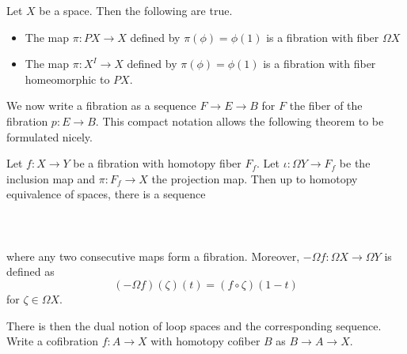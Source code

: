 \documentclass[a4paper]{article}
\begin{document}
\begin{thm}{}{} Let $X$ be a space. Then the following are true. 
\begin{itemize}
\item The map $\pi:PX\to X$ defined by $\pi(\phi)=\phi(1)$ is a fibration with fiber $\Omega X$
\item The map $\pi:X^I\to X$ defined by $\pi(\phi)=\phi(1)$ is a fibration with fiber homeomorphic to $PX$. 
\end{itemize}
\end{thm}

We now write a fibration as a sequence $F\to E\to B$ for $F$ the fiber of the fibration $p:E\to B$. This compact notation allows the following theorem to be formulated nicely. 

\begin{thm}{}{} Let $f:X\to Y$ be a fibration with homotopy fiber $F_f$. Let $\iota:\Omega Y\to F_f$ be the inclusion map and $\pi:F_f\to X$ the projection map. Then up to homotopy equivalence of spaces, there is a sequence \\~\\
\\~\\
where any two consecutive maps form a fibration. Moreover, $-\Omega f:\Omega X\to\Omega Y$ is defined as $$(-\Omega f)(\zeta)(t)=(f\circ\zeta)(1-t)$$ for $\zeta\in\Omega X$. 
\end{thm}

There is then the dual notion of loop spaces and the corresponding sequence. Write a cofibration $f:A\to X$ with homotopy cofiber $B$ as $B\to A\to X$. 
\end{document}
